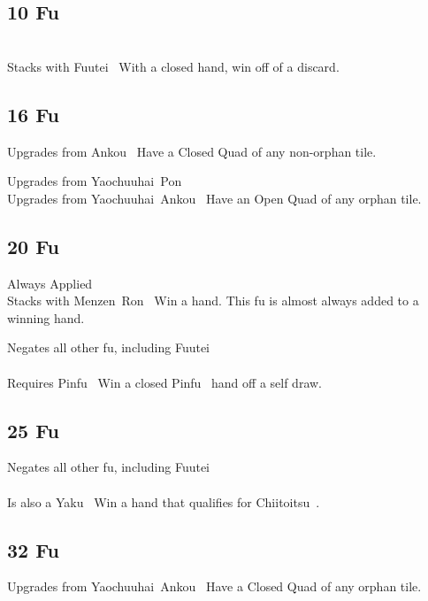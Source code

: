\subsection{10 Fu}\label{core:ssec:10-fu}

	{\closedhand \\
	\upgradesfrom Stacks with Fuutei~}
	{With a closed hand, win off of a discard.}


\subsection{16 Fu}\label{core:ssec:16-fu}

	{\upgradesfrom Upgrades from Ankou~}
	{Have a Closed Quad of any non-orphan tile.}

	{\upgradesfrom Upgrades from Yaochuuhai~Pon~\\
	\upgradesfrom Upgrades from Yaochuuhai~Ankou~}
	{Have an Open Quad of any orphan tile.}


\subsection{20 Fu}\label{core:ssec:20-fu}

	{\symbalert Always Applied \\
	\upgradesto Stacks with Menzen~Ron~}
	{Win a hand. This fu is almost always added to a winning hand.}

	{\symbnegate Negates all other fu, including Fuutei~ \\
	\closedhand \\
	\upgradesfromother Requires Pinfu~}
	{Win a closed Pinfu~ hand off a self draw.}


\subsection{25 Fu}\label{core:ssec:25-fu}

	{\symbnegate Negates all other fu, including Fuutei~ \\
	\closedhand \\
	\upgradesfromother Is also a Yaku~}
	{Win a hand that qualifies for Chiitoitsu~.}


\subsection{32 Fu}\label{core:ssec:32-fu}

	{\upgradesfrom Upgrades from Yaochuuhai~Ankou~}
	{Have a Closed Quad of any orphan tile.}